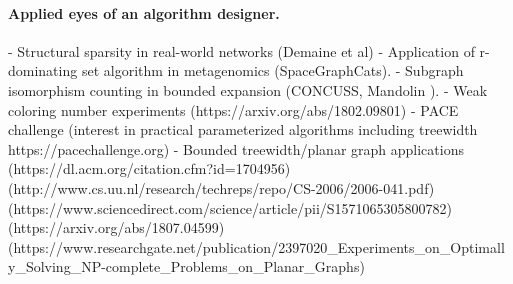 \paragraph*{Applied eyes of an algorithm designer.}

- Structural sparsity in real-world networks (Demaine et al)
- Application of r-dominating set algorithm in metagenomics (SpaceGraphCats).
- Subgraph isomorphism counting in bounded expansion (CONCUSS, Mandolin ).
- Weak coloring number experiments (https://arxiv.org/abs/1802.09801)
- PACE challenge (interest in practical parameterized algorithms including treewidth https://pacechallenge.org)
- Bounded treewidth/planar graph applications (https://dl.acm.org/citation.cfm?id=1704956)
(http://www.cs.uu.nl/research/techreps/repo/CS-2006/2006-041.pdf)
(https://www.sciencedirect.com/science/article/pii/S1571065305800782)
(https://arxiv.org/abs/1807.04599)
(https://www.researchgate.net/publication/2397020_Experiments_on_Optimally_Solving_NP-complete_Problems_on_Planar_Graphs)
